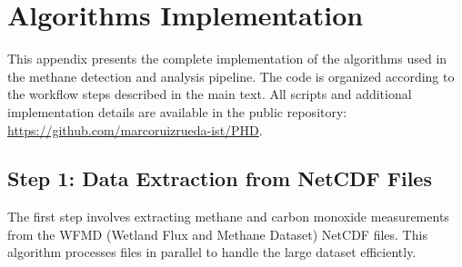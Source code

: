 \chapter{Algorithms Implementation}
\label{chapter:appendixB}

This appendix presents the complete implementation of the algorithms used in the methane detection and analysis pipeline. The code is organized according to the workflow steps described in the main text. All scripts and additional implementation details are available in the public repository: \url{https://github.com/marcoruizrueda-ist/PHD}.



\section{Step 1: Data Extraction from NetCDF Files}
\label{sec:appendixB_step1}

The first step involves extracting methane and carbon monoxide measurements from the WFMD (Wetland Flux and Methane Dataset) NetCDF files. This algorithm processes files in parallel to handle the large dataset efficiently.

